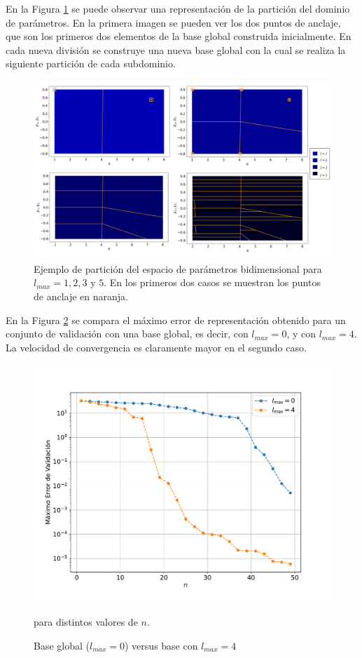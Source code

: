 En la Figura \ref{fig:part1} se puede observar una representación de la partición del dominio de parámetros. En la primera imagen se pueden ver los dos puntos de anclaje, que son los primeros dos elementos de la base global construida inicialmente. En cada nueva división se construye una nueva base global con la cual se realiza la siguiente partición de cada subdominio.


\begin{figure}[h!]
\centering
\includegraphics[width=1\columnwidth]{figs/particion2d.png}
\caption{Ejemplo de partición del espacio de parámetros bidimensional para $l_{max}= 1, 2, 3$ y $5$. En los primeros dos casos se muestran los puntos de anclaje en naranja.}
\label{fig:part1}
\end{figure}


En la Figura \ref{fig:l0vl4} se compara el máximo error de representación obtenido para un conjunto de validación con una base global, es decir, con $l_{max} = 0$, y con $l_{max}=4$. La velocidad de convergencia es claramente mayor en el segundo caso.

\begin{figure}[h!]
\centering
\includegraphics[width=.8\columnwidth, trim={0, 1.3cm, 0, 1.4cm}]{figs/l0vsl4.pdf}
\caption{Base global ($l_{max} = 0$) versus base con $l_{max} = 4$} para distintos valores de $n$.
\label{fig:l0vl4}
\end{figure}



